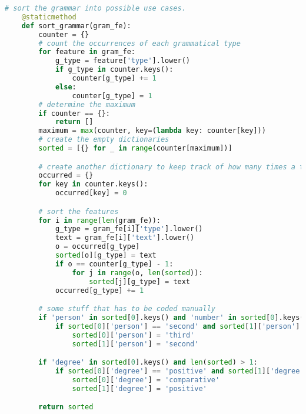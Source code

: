 \begin{lstlisting}[caption={[Grammatical Features Extraction Code] Python code that extracts and sorts the grammatical features given by \textit{Oxford Dictionaires API}}, label=lst:gramm, breaklines=true, language=python, breakatwhitespace=true, float]
    # sort the grammar into possible use cases.
    @staticmethod
    def sort_grammar(gram_fe):
        counter = {}
        # count the occurrences of each grammatical type
        for feature in gram_fe:
            g_type = feature['type'].lower()
            if g_type in counter.keys():
                counter[g_type] += 1
            else:
                counter[g_type] = 1
        # determine the maximum
        if counter == {}:
            return []
        maximum = max(counter, key=(lambda key: counter[key]))
        # create the empty dictionaries
        sorted = [{} for _ in range(counter[maximum])]

        # create another dictionary to keep track of how many times a type has occurred while sorting.
        occurred = {}
        for key in counter.keys():
            occurred[key] = 0

        # sort the features
        for i in range(len(gram_fe)):
            g_type = gram_fe[i]['type'].lower()
            text = gram_fe[i]['text'].lower()
            o = occurred[g_type]
            sorted[o][g_type] = text
            if o == counter[g_type] - 1:
                for j in range(o, len(sorted)):
                    sorted[j][g_type] = text
            occurred[g_type] += 1

        # some stuff that has to be coded manually
        if 'person' in sorted[0].keys() and 'number' in sorted[0].keys() and len(sorted) >= 2:
            if sorted[0]['person'] == 'second' and sorted[1]['person'] == 'third':
                sorted[0]['person'] = 'third'
                sorted[1]['person'] = 'second'

        if 'degree' in sorted[0].keys() and len(sorted) > 1:
            if sorted[0]['degree'] == 'positive' and sorted[1]['degree'] == 'comparative':
                sorted[0]['degree'] = 'comparative'
                sorted[1]['degree'] = 'positive'

        return sorted
\end{lstlisting}
